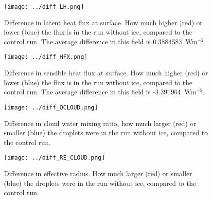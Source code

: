\begin{figure}
\centering
\texttt{[image: ../diff\_LH.png]}
\caption{Difference in latent heat flux at surface. How much higher (red) or lower (blue) the flux is in the run without ice, compared to the control run. The average difference in this field is 0.3884583~Wm$^{-2}$.}
\label{fig:lh}
\end{figure}

\begin{figure}
\centering
\texttt{[image: ../diff\_HFX.png]}
\caption{Difference in sensible heat flux at surface. How much higher (red) or lower (blue) the flux is in the run without ice, compared to the control run. The average difference in this field is -3.391964~Wm$^{-2}$.}
\label{fig:hfx}
\end{figure}

\begin{figure}
\centering
\texttt{[image: ../diff\_QCLOUD.png]}
\caption{Difference in cloud water mixing ratio, how much larger (red) or smaller (blue) the droplets were in the run without ice, compared to the control run.}
\label{fig:qcloud}
\end{figure}

\begin{figure}
\centering
\texttt{[image: ../diff\_RE\_CLOUD.png]}
\caption{Difference in effective radius. How much larger (red) or smaller (blue) the droplets were in the run without ice, compared to the control run.}
\label{fig:re_cloud}
\end{figure}







